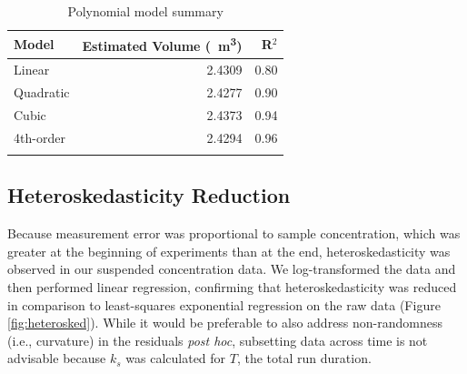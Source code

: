 \documentclass[geosciences,article,submit,moreauthors,pdftex]{Definitions/mdpi}
\begin{document}
\begin{table}[htb]
\caption{Polynomial model summary}
\centering
\begin{tabular}{lrr}
\toprule
\textbf{Model}&\textbf{Estimated Volume (\SI{}{\metre\cubed})}&\textbf{R$^2$}\\
\midrule
Linear       &  2.4309     &   0.80\\
Quadratic    &  2.4277     &   0.90\\
Cubic        &  2.4373     &   0.94\\
4th-order    &  2.4294     &   0.96\\
\bottomrule
\label{tbl:flumevol}
\end{tabular}
\end{table}

\subsection{Heteroskedasticity Reduction}

Because measurement error was proportional to sample concentration, which was greater at the beginning of experiments than at the end, heteroskedasticity was observed in our suspended concentration data. We log-transformed the data and then performed linear regression, confirming that heteroskedasticity was reduced in comparison to least-squares exponential regression on the raw data (Figure \ref{fig:heterosked}). While it would be preferable to also address non-randomness (i.e., curvature) in the residuals \textit{post hoc}, subsetting data across time is not advisable because $k_s$ was calculated for $T$, the total run duration.
\end{document}
